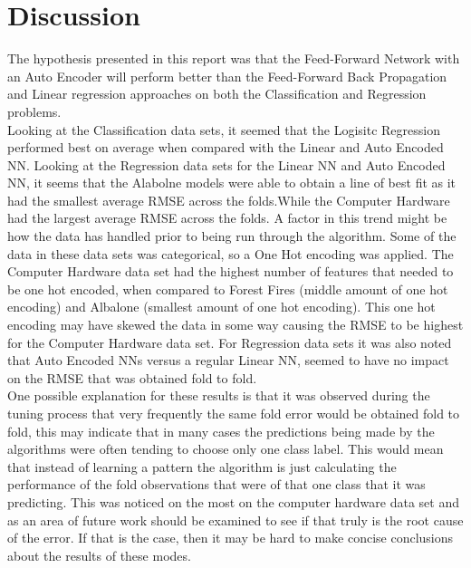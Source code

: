 \documentclass[twoside,11pt]{article}
\begin{document}
\section{Discussion}
\hspace*{10mm} The hypothesis presented in this report was that the  Feed-Forward Network with an Auto Encoder will perform better than the Feed-Forward Back Propagation and Linear regression approaches on both the Classification and Regression problems.\\
\hspace*{10mm} Looking at the Classification data sets, it seemed that the Logisitc Regression performed best on average when compared with the Linear and Auto Encoded NN. Looking at the Regression data sets for the Linear NN and Auto Encoded NN, it seems that the Alabolne models were able to obtain a line of best fit as it had the smallest average RMSE across the folds.While the Computer Hardware had the largest average RMSE across the folds. A factor in this trend might be how the data has handled prior to being run through the algorithm. Some of the data in these data sets was categorical, so a One Hot encoding was applied. The Computer Hardware data set had the highest number of features that needed to be one hot encoded, when compared to Forest Fires (middle amount of one hot encoding) and Albalone (smallest amount of one hot encoding). This one hot encoding may have skewed the data in some way causing the RMSE to be highest for the Computer Hardware data set. For Regression data sets it was also noted that Auto Encoded NNs versus a regular Linear NN, seemed to have no impact on the RMSE that was obtained fold to fold. \\
\hspace*{10mm} One possible explanation for these results is that it was observed during the tuning process that very frequently the same fold error would be obtained fold to fold, this may indicate that in many cases the predictions being made by the algorithms were often tending to choose only one class label. This would mean that instead of learning a pattern the algorithm is just calculating the performance of the fold observations that were of that one class that it was predicting. This was noticed on the most on the computer hardware data set and as an area of future work should be examined to see if that truly is the root cause of the error. If that is the case, then it may be hard to make concise conclusions about the results of these modes.\\ 
\end{document}

